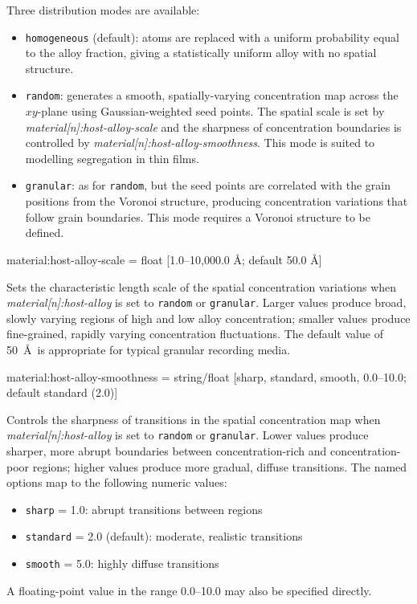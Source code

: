 Three distribution modes are available:
\begin{itemize}
  \item[] \texttt{homogeneous} (default): atoms are replaced with a uniform probability equal to the alloy fraction, giving a statistically uniform alloy with no spatial structure.
  \item[] \texttt{random}: generates a smooth, spatially-varying concentration map across the $xy$-plane using Gaussian-weighted seed points. The spatial scale is set by \textit{material[n]:host-alloy-scale} and the sharpness of concentration boundaries is controlled by \textit{material[n]:host-alloy-smoothness}. This mode is suited to modelling segregation in thin films.
  \item[] \texttt{granular}: as for \texttt{random}, but the seed points are correlated with the grain positions from the Voronoi structure, producing concentration variations that follow grain boundaries. This mode requires a Voronoi structure to be defined.
\end{itemize}

{\zicf material:host-alloy-scale = float [1.0--10,000.0 \AA; default 50.0 \AA]} Sets the characteristic length scale of the spatial concentration variations when \textit{material[n]:host-alloy} is set to \texttt{random} or \texttt{granular}. Larger values produce broad, slowly varying regions of high and low alloy concentration; smaller values produce fine-grained, rapidly varying concentration fluctuations. The default value of 50~\AA\ is appropriate for typical granular recording media.

{\zicf material:host-alloy-smoothness = string/float [sharp, standard, smooth, 0.0--10.0; default standard (2.0)]} Controls the sharpness of transitions in the spatial concentration map when \textit{material[n]:host-alloy} is set to \texttt{random} or \texttt{granular}. Lower values produce sharper, more abrupt boundaries between concentration-rich and concentration-poor regions; higher values produce more gradual, diffuse transitions. The named options map to the following numeric values:
\begin{itemize}
  \item[] \texttt{sharp} = 1.0: abrupt transitions between regions
  \item[] \texttt{standard} = 2.0 (default): moderate, realistic transitions
  \item[] \texttt{smooth} = 5.0: highly diffuse transitions
\end{itemize}
A floating-point value in the range 0.0--10.0 may also be specified directly.

